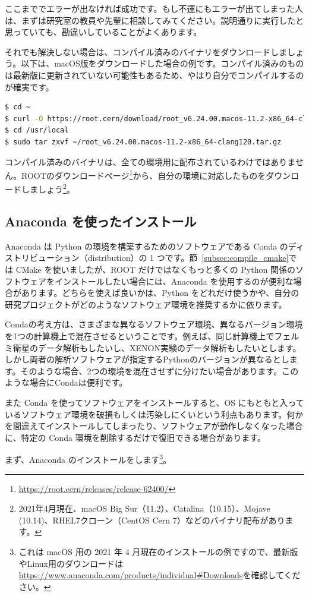 {ここまででエラーが出なければ成功です。もし不運にもエラーが出てしまった人は、まずは研究室の教員や先輩に相談してみてください。説明通りに実行したと思っていても、勘違いしていることがよくあります。

それでも解決しない場合は、コンパイル済みのバイナリをダウンロードしましょう。以下は、macOS版をダウンロードした場合の例です。コンパイル済みのものは最新版に更新されていない可能性もあるため、やはり自分でコンパイルするのが確実です。
\begin{lstlisting}[language=bash]
$ cd ~
$ curl -O https://root.cern/download/root_v6.24.00.macos-11.2-x86_64-clang120.tar.gz
$ cd /usr/local
$ sudo tar zxvf ~/root_v6.24.00.macos-11.2-x86_64-clang120.tar.gz
\end{lstlisting}
コンパイル済みのバイナリは、全ての環境用に配布されているわけではありません。ROOTのダウンロードページ\footnote{\url{https://root.cern/releases/release-62400/}}から、自分の環境に対応したものをダウンロードしましょう\footnote{2021年4月現在、macOS Big Sur（11.2）、Catalina（10.15）、Mojave (10.14)、RHEL7クローン（CentOS Cern 7）などのバイナリ配布があります。}。

\subsection{Anaconda を使ったインストール}
Anaconda は Python の環境を構築するためのソフトウェアである Conda のディストリビューション（distribution）の 1 つです。節~\ref{subsec:compile_cmake}では CMake を使いましたが、ROOT だけではなくもっと多くの Python 関係のソフトウェアをインストールしたい場合には、Anaconda を使用するのが便利な場合があります。どちらを使えば良いかは、Python をどれだけ使うかや、自分の研究プロジェクトがどのようなソフトウェア環境を推奨するかに依ります。

Condaの考え方は、さまざまな異なるソフトウェア環境、異なるバージョン環境を1つの計算機上で混在させるということです。例えば、同じ計算機上でフェルミ衛星のデータ解析もしたいし、XENON実験のデータ解析もしたいとします。しかし両者の解析ソフトウェアが指定するPythonのバージョンが異なるとします。そのような場合、2つの環境を混在させずに分けたい場合があります。このような場合にCondaは便利です。

また Conda を使ってソフトウェアをインストールすると、OS にもともと入っているソフトウェア環境を破損もしくは汚染しにくいという利点もあります。何かを間違えてインストールしてしまったり、ソフトウェアが動作しなくなった場合に、特定の Conda 環境を削除するだけで復旧できる場合があります。

まず、Anaconda のインストールをします\footnote{これは macOS 用の 2021 年 4 月現在のインストールの例ですので、最新版やLinux用のダウンロードは\url{https://www.anaconda.com/products/individual\#Downloads}を確認してください。}。

}
